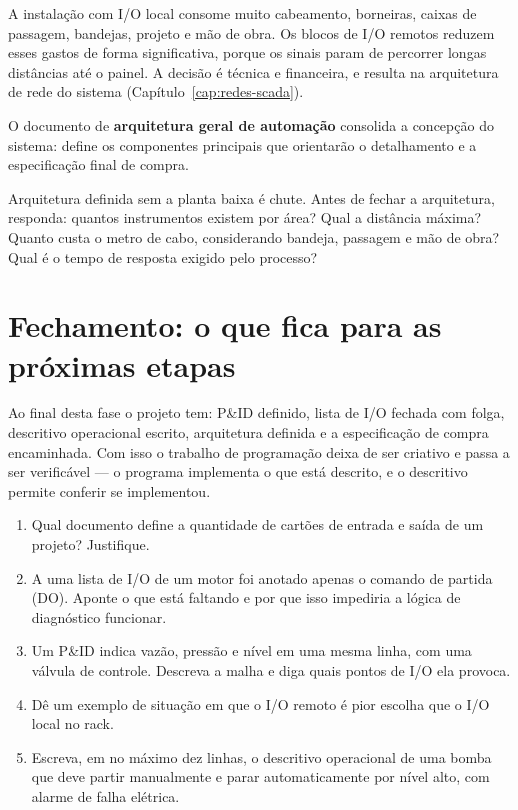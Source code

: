 A instalação com I/O local consome muito cabeamento, borneiras, caixas de passagem, bandejas,
projeto e mão de obra. Os blocos de I/O remotos reduzem esses gastos de forma significativa, porque
os sinais param de percorrer longas distâncias até o painel. A decisão é técnica e financeira, e
resulta na arquitetura de rede do sistema (Capítulo~\ref{cap:redes-scada}).

O documento de \textbf{arquitetura geral de automação} consolida a concepção do sistema: define os
componentes principais que orientarão o detalhamento e a especificação final de compra.

\begin{atencao}
Arquitetura definida sem a planta baixa é chute. Antes de fechar a arquitetura, responda: quantos
instrumentos existem por área? Qual a distância máxima? Quanto custa o metro de cabo, considerando
bandeja, passagem e mão de obra? Qual é o tempo de resposta exigido pelo processo?
\end{atencao}

\section{Fechamento: o que fica para as próximas etapas}

Ao final desta fase o projeto tem: P\&ID definido, lista de I/O fechada com folga, descritivo
operacional escrito, arquitetura definida e a especificação de compra encaminhada. Com isso o
trabalho de programação deixa de ser criativo e passa a ser verificável --- o programa implementa o
que está descrito, e o descritivo permite conferir se implementou.

\begin{exercicios}
\begin{enumerate}[label=\alph*)]
  \item Qual documento define a quantidade de cartões de entrada e saída de um projeto? Justifique.
  \item A uma lista de I/O de um motor foi anotado apenas o comando de partida (DO). Aponte o que
        está faltando e por que isso impediria a lógica de diagnóstico funcionar.
  \item Um P\&ID indica vazão, pressão e nível em uma mesma linha, com uma válvula de controle.
        Descreva a malha e diga quais pontos de I/O ela provoca.
  \item Dê um exemplo de situação em que o I/O remoto é pior escolha que o I/O local no rack.
  \item Escreva, em no máximo dez linhas, o descritivo operacional de uma bomba que deve partir
        manualmente e parar automaticamente por nível alto, com alarme de falha elétrica.
\end{enumerate}
\end{exercicios}
